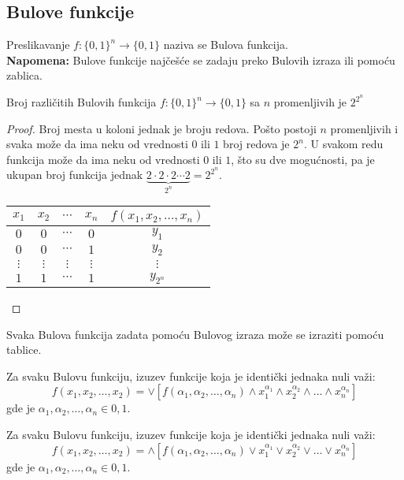 \subsection{Bulove funkcije}
\begin{definition}
	Preslikavanje $f: \{0, 1\}^n \to \{0, 1\}$ naziva se Bulova funkcija.\\
	\textbf{Napomena:} Bulove funkcije najčešće se zadaju preko Bulovih izraza ili pomoću zablica.
\end{definition}
\begin{theorem}
	Broj različitih Bulovih funkcija $f: \{0, 1\}^n \to \{0, 1\}$ sa $n$ promenljivih je $2^{2^n}$
\end{theorem}
\begin{proof}
	Broj mesta u koloni jednak je broju redova. Pošto postoji $n$ promenljivih i svaka može da ima neku od vrednosti $0$ ili $1$ broj redova je $2^n$. U svakom redu funkcija može da ima neku od vrednosti $0$ ili $1$, što su dve mogućnosti, pa je ukupan broj funkcija jednak $\underbrace{2\cdot2\cdot2\cdots2}_{2^n} = 2^{2^n}$.
	\begin{table}[h!]
	\centering
	\begin{tabular}{|c|c|c|c|c|}
		\hline
		$x_1$ & $x_2$ & $\cdots$ & $x_n$ & $f(x_1, x_2, \ldots, x_n)$ \\ \hline
		$0$ & $0$ & $\cdots$ & $0$ & $y_1$ \\ \hline
		$0$ & $0$ & $\cdots$ & $1$ & $y_2$ \\ \hline
		$\vdots$ & $\vdots$ & $\vdots$ & $\vdots$ & $\vdots$ \\ \hline
		$1$ & $1$ & $\cdots$ & $1$ & $y_{2^n}$ \\ \hline
	\end{tabular}
	\end{table}
\end{proof}
\begin{theorem}
	Svaka Bulova funkcija zadata pomoću Bulovog izraza može se izraziti pomoću tablice.
\end{theorem}
\begin{theorem}
	Za svaku Bulovu funkciju, izuzev funkcije koja je identički jednaka nuli važi:
	$$f(x_1, x_2, \ldots, x_2) = \lor \left[ f(\alpha_1, \alpha_2, \ldots, \alpha_n) \land x_1^{\alpha_1} \land x_2^{\alpha_2} \land \ldots \land x_n^{\alpha_n} \right]$$
	gde je $\alpha_1, \alpha_2, \ldots, \alpha_n \in {0, 1}$.
\end{theorem}
\begin{theorem}Za svaku Bulovu funkciju, izuzev funkcije koja je identički jednaka nuli važi:
	$$f(x_1, x_2, \ldots, x_2) = \land \left[ f(\alpha_1, \alpha_2, \ldots, \alpha_n) \lor x_1^{\alpha_1} \lor x_2^{\alpha_2} \lor \ldots \lor x_n^{\alpha_n} \right]$$
	gde je $\alpha_1, \alpha_2, \ldots, \alpha_n \in {0, 1}$.
\end{theorem}


